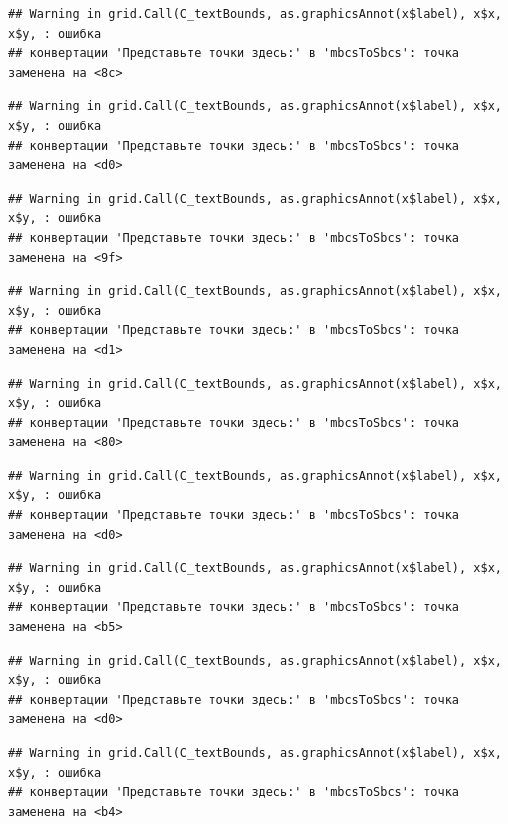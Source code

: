 \documentclass[]{book}
\begin{document}
\begin{verbatim}
## Warning in grid.Call(C_textBounds, as.graphicsAnnot(x$label), x$x, x$y, : ошибка
## конвертации 'Представьте точки здесь:' в 'mbcsToSbcs': точка заменена на <8c>
\end{verbatim}

\begin{verbatim}
## Warning in grid.Call(C_textBounds, as.graphicsAnnot(x$label), x$x, x$y, : ошибка
## конвертации 'Представьте точки здесь:' в 'mbcsToSbcs': точка заменена на <d0>
\end{verbatim}

\begin{verbatim}
## Warning in grid.Call(C_textBounds, as.graphicsAnnot(x$label), x$x, x$y, : ошибка
## конвертации 'Представьте точки здесь:' в 'mbcsToSbcs': точка заменена на <9f>
\end{verbatim}

\begin{verbatim}
## Warning in grid.Call(C_textBounds, as.graphicsAnnot(x$label), x$x, x$y, : ошибка
## конвертации 'Представьте точки здесь:' в 'mbcsToSbcs': точка заменена на <d1>
\end{verbatim}

\begin{verbatim}
## Warning in grid.Call(C_textBounds, as.graphicsAnnot(x$label), x$x, x$y, : ошибка
## конвертации 'Представьте точки здесь:' в 'mbcsToSbcs': точка заменена на <80>
\end{verbatim}

\begin{verbatim}
## Warning in grid.Call(C_textBounds, as.graphicsAnnot(x$label), x$x, x$y, : ошибка
## конвертации 'Представьте точки здесь:' в 'mbcsToSbcs': точка заменена на <d0>
\end{verbatim}

\begin{verbatim}
## Warning in grid.Call(C_textBounds, as.graphicsAnnot(x$label), x$x, x$y, : ошибка
## конвертации 'Представьте точки здесь:' в 'mbcsToSbcs': точка заменена на <b5>
\end{verbatim}

\begin{verbatim}
## Warning in grid.Call(C_textBounds, as.graphicsAnnot(x$label), x$x, x$y, : ошибка
## конвертации 'Представьте точки здесь:' в 'mbcsToSbcs': точка заменена на <d0>
\end{verbatim}

\begin{verbatim}
## Warning in grid.Call(C_textBounds, as.graphicsAnnot(x$label), x$x, x$y, : ошибка
## конвертации 'Представьте точки здесь:' в 'mbcsToSbcs': точка заменена на <b4>
\end{verbatim}
\end{document}
